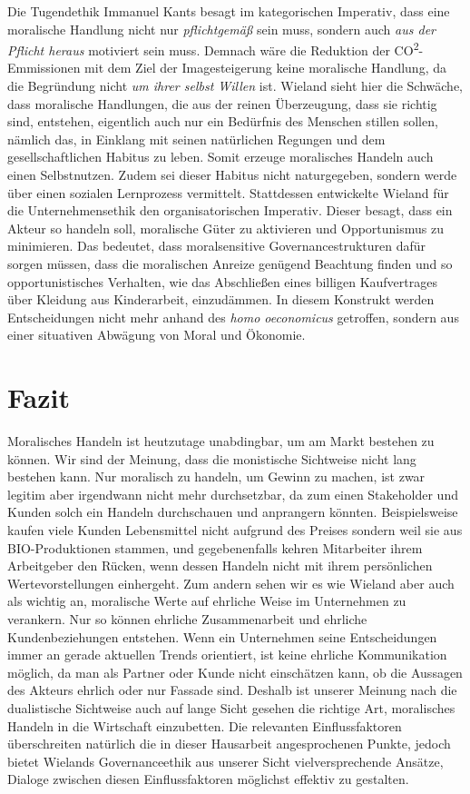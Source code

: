 \documentclass[12pt]{article}
\begin{document}
Die Tugendethik Immanuel Kants besagt im kategorischen Imperativ, dass eine moralische Handlung nicht nur \textit{pflichtgemäß} sein muss, sondern auch \textit{aus der Pflicht heraus} motiviert sein muss. Demnach wäre die Reduktion der CO\textsuperscript{2}-Emmissionen mit dem Ziel der Imagesteigerung keine moralische Handlung, da die Begründung nicht \textit{um ihrer selbst Willen} ist. Wieland sieht hier die Schwäche, dass moralische Handlungen, die aus der reinen Überzeugung, dass sie richtig sind, entstehen, eigentlich auch nur ein Bedürfnis des Menschen stillen sollen, nämlich das, in Einklang mit seinen natürlichen Regungen und dem gesellschaftlichen Habitus zu leben. Somit erzeuge moralisches Handeln auch einen Selbstnutzen. Zudem sei dieser Habitus nicht naturgegeben, sondern werde über einen sozialen Lernprozess vermittelt. Stattdessen entwickelte Wieland für die Unternehmensethik den organisatorischen Imperativ. Dieser besagt, dass ein Akteur so handeln soll, moralische Güter zu aktivieren und Opportunismus zu minimieren. Das bedeutet, dass moralsensitive Governancestrukturen dafür sorgen müssen, dass die moralischen Anreize genügend Beachtung finden und so opportunistisches Verhalten, wie das Abschließen eines billigen Kaufvertrages über Kleidung aus Kinderarbeit, einzudämmen. In diesem Konstrukt werden Entscheidungen nicht mehr anhand des \textit{homo oeconomicus} getroffen, sondern aus einer situativen Abwägung von Moral und Ökonomie.

\part{Fazit}
Moralisches Handeln ist heutzutage unabdingbar, um am Markt bestehen zu können. Wir sind der Meinung, dass die monistische Sichtweise nicht lang bestehen kann. Nur moralisch zu handeln, um Gewinn zu machen, ist zwar legitim aber irgendwann nicht mehr durchsetzbar, da zum einen Stakeholder und Kunden solch ein Handeln durchschauen und anprangern könnten. Beispielsweise kaufen viele Kunden Lebensmittel nicht aufgrund des Preises sondern weil sie aus BIO-Produktionen stammen, und gegebenenfalls kehren Mitarbeiter ihrem Arbeitgeber den Rücken, wenn dessen Handeln nicht mit ihrem persönlichen Wertevorstellungen einhergeht. Zum andern sehen wir es wie Wieland aber auch als wichtig an, moralische Werte auf ehrliche Weise im Unternehmen zu verankern. Nur so können ehrliche Zusammenarbeit und ehrliche Kundenbeziehungen entstehen. Wenn ein Unternehmen seine Entscheidungen immer an gerade aktuellen Trends orientiert, ist keine ehrliche Kommunikation möglich, da man als Partner oder Kunde nicht einschätzen kann, ob die Aussagen des Akteurs ehrlich oder nur Fassade sind. Deshalb ist unserer Meinung nach die dualistische Sichtweise auch auf lange Sicht gesehen die richtige Art, moralisches Handeln in die Wirtschaft einzubetten. Die relevanten Einflussfaktoren überschreiten natürlich die in dieser Hausarbeit angesprochenen Punkte, jedoch bietet Wielands Governanceethik aus unserer Sicht vielversprechende Ansätze, Dialoge zwischen diesen Einflussfaktoren möglichst effektiv zu gestalten.


\clearpage
\frontmatter%
\renewcommand{\plaintitle}{Literaturverzeichnis}
\setcounter{page}{3}
\printMyBibliography
\end{document}
